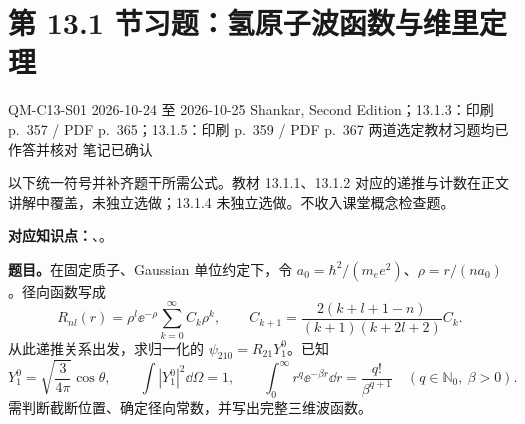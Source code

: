 \section{第 13.1 节习题：氢原子波函数与维里定理}
\label{exercises:QM-C13-S01}
\exercisemeta
  {QM-C13-S01}
  {2026-10-24 至 2026-10-25}
  {Shankar, Second Edition；13.1.3：印刷 p.~357 / PDF p.~365；13.1.5：印刷 p.~359 / PDF p.~367}
  {两道选定教材习题均已作答并核对}
  {笔记已确认}

以下统一符号并补齐题干所需公式。教材 13.1.1、13.1.2 对应的递推与计数在正文讲解中覆盖，未独立选做；13.1.4 未独立选做。不收入课堂概念检查题。

\textbf{对应知识点：}、。

\textbf{题目。}在固定质子、Gaussian 单位约定下，令 $a_0=\hbar^2/(m_e e^2)$、$\rho=r/(na_0)$。径向函数写成
\begin{equation}
  R_{nl}(r)=\rho^l\ee^{-\rho}\sum_{k=0}^\infty C_k\rho^k,
  \qquad
  C_{k+1}=\frac{2(k+l+1-n)}{(k+1)(k+2l+2)}C_k.
\end{equation}
从此递推关系出发，求归一化的 $\psi_{210}=R_{21}Y_1^0$。已知
\begin{equation}
  Y_1^0=\sqrt{\frac3{4\pi}}\cos\theta,\qquad
  \int|Y_1^0|^2\dd\Omega=1,
  \qquad \int_0^\infty r^q\ee^{-\beta r}\dd r
    =\frac{q!}{\beta^{q+1}}\quad(q\in\mathbb N_0,\ \beta>0).
\end{equation}
需判断截断位置、确定径向常数，并写出完整三维波函数。

